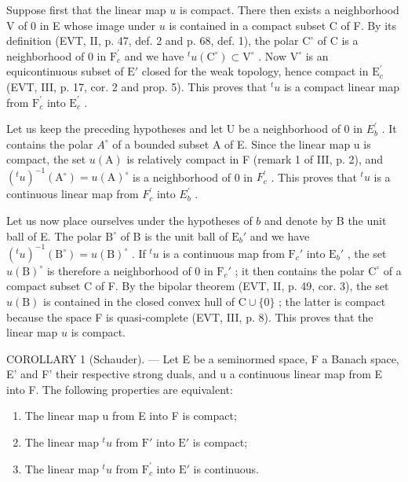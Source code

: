 Suppose first that the linear map \(u\) is compact. There then exists a neighborhood V of 0 in E whose image under \(u\) is contained in a compact subset C of F. By its definition (EVT, II, p. 47, def. 2 and p. 68, def. 1), the polar \(\mathrm{C}^{\circ}\) of C is a neighborhood of 0 in \(\mathrm{F}_c^\prime\) and we have \({}^t u(\mathrm{C}^\circ) \subset \mathrm{V}^\circ\) . Now \(\mathrm{V}^\circ\) is an equicontinuous subset of \(\mathrm{E}'\) closed for the weak topology, hence compact in \(\mathrm{E}_c^\prime\) (EVT, III, p. 17, cor. 2 and prop. 5). This proves that \({}^t u\) is a compact linear map from \(\mathrm{F}_c^\prime\) into \(\mathrm{E}_c^\prime\) .

Let us keep the preceding hypotheses and let U be a neighborhood of 0 in \(E_{b}^{\prime}\) . It contains the polar \(A^{\circ}\) of a bounded subset A of E. Since the linear map u is compact, the set \(u(\mathrm{A})\) is relatively compact in F (remark 1 of III, p. 2), and \((^{t}u)^{-1}(\mathrm{A}^{\circ}) = u(\mathrm{A})^{\circ}\) is a neighborhood of 0 in \(F_{c}^{\prime}\) . This proves that \(^{t}u\) is a continuous linear map from \(F_{c}^{\prime}\) into \(E_{b}^{\prime}\) .

Let us now place ourselves under the hypotheses of \(b\) and denote by B the unit ball of E. The polar \(\mathrm{B}^{\circ}\) of B is the unit ball of \(\mathrm{E}_b'\) and we have \((^{t}u)^{-1}(\mathrm{B}^{\circ}) = u(\mathrm{B})^{\circ}\) . If \(^{t}u\) is a continuous map from \(\mathrm{F}_c'\) into \(\mathrm{E}_b'\) , the set \(u(\mathrm{B})^{\circ}\) is therefore a neighborhood of 0 in \(\mathrm{F}_c'\) ; it then contains the polar \(\mathrm{C}^{\circ}\) of a compact subset C of F. By the bipolar theorem (EVT, II, p. 49, cor. 3), the set \(u(\mathrm{B})\) is contained in the closed convex hull of \(\mathrm{C} \cup \{0\}\) ; the latter is compact because the space F is quasi-complete (EVT, III, p. 8). This proves that the linear map \(u\) is compact.

COROLLARY 1 (Schauder). --- Let E be a seminormed space, F a Banach space, E' and F' their respective strong duals, and u a continuous linear map from E into F. The following properties are equivalent:

\begin{enumerate}
\def\labelenumi{(\roman{enumi})}
\item
  The linear map u from E into F is compact;
\item
  The linear map \({}^{t}u\) from \(\mathrm{F}'\) into \(\mathrm{E}'\) is compact;
\item
  The linear map \({}^{t}u\) from \(\mathrm{F}_{c}^{\prime}\) into \(\mathrm{E}'\) is continuous.
\end{enumerate}

